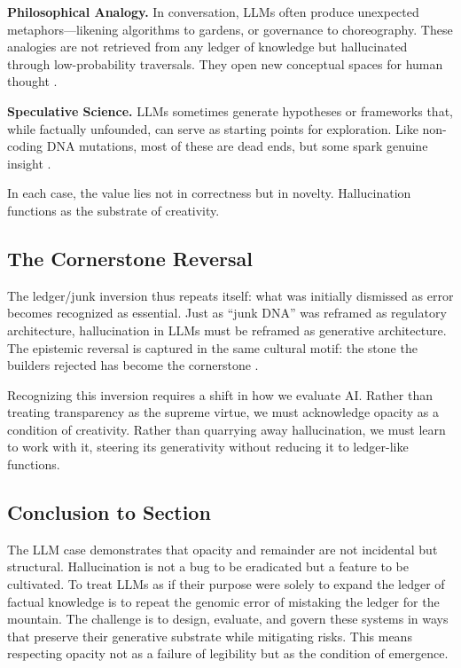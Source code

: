 \documentclass[11pt]{article}
\begin{document}
\textbf{Philosophical Analogy.} In conversation, LLMs often produce unexpected metaphors---likening algorithms to gardens, or governance to choreography. These analogies are not retrieved from any ledger of knowledge but hallucinated through low-probability traversals. They open new conceptual spaces for human thought \citep{hofstadter1995}.

\textbf{Speculative Science.} LLMs sometimes generate hypotheses or frameworks that, while factually unfounded, can serve as starting points for exploration. Like non-coding DNA mutations, most of these are dead ends, but some spark genuine insight \citep{rheinberger1997}.

In each case, the value lies not in correctness but in novelty. Hallucination functions as the substrate of creativity.

\subsection{The Cornerstone Reversal}
The ledger/junk inversion thus repeats itself: what was initially dismissed as error becomes recognized as essential. Just as ``junk DNA'' was reframed as regulatory architecture, hallucination in LLMs must be reframed as generative architecture. The epistemic reversal is captured in the same cultural motif: the stone the builders rejected has become the cornerstone \citep{glissant1997}.

Recognizing this inversion requires a shift in how we evaluate AI. Rather than treating transparency as the supreme virtue, we must acknowledge opacity as a condition of creativity. Rather than quarrying away hallucination, we must learn to work with it, steering its generativity without reducing it to ledger-like functions.

\subsection{Conclusion to Section}
The LLM case demonstrates that opacity and remainder are not incidental but structural. Hallucination is not a bug to be eradicated but a feature to be cultivated. To treat LLMs as if their purpose were solely to expand the ledger of factual knowledge is to repeat the genomic error of mistaking the ledger for the mountain. The challenge is to design, evaluate, and govern these systems in ways that preserve their generative substrate while mitigating risks. This means respecting opacity not as a failure of legibility but as the condition of emergence.
\end{document}
